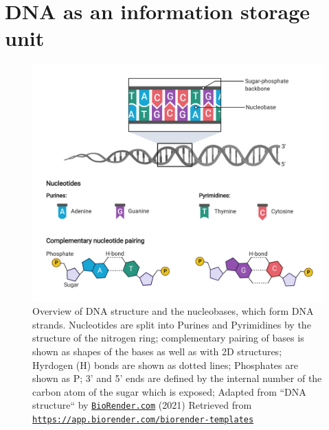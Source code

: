\section[DNA]{DNA as an information storage unit} 
\label{intro-sec:DNA}

\begin{figure}[!ht]
\centering
\includegraphics[width=0.9\linewidth]{Figures/intro/DNAStructure}
\caption[Overview DNA structure]{Overview of DNA structure and the nucleobases, which form DNA strands. Nucleotides are split into Purines and Pyrimidines by the structure of the nitrogen ring; complementary pairing of bases is shown as shapes of the bases as well as with 2D structures; Hyrdogen (H) bonds are shown as dotted lines; Phosphates are shown as P; 3' and 5' ends are defined by the internal number of the carbon atom of the sugar which is exposed; Adapted from ``DNA structure`` by \href{https://biorender.com}{\nolinkurl{BioRender.com}} (2021) Retrieved from \href{https://app.biorender.com/biorender-templates}{\nolinkurl{https://app.biorender.com/biorender-templates}}}\label{fig:DNAstructure}
\end{figure}


